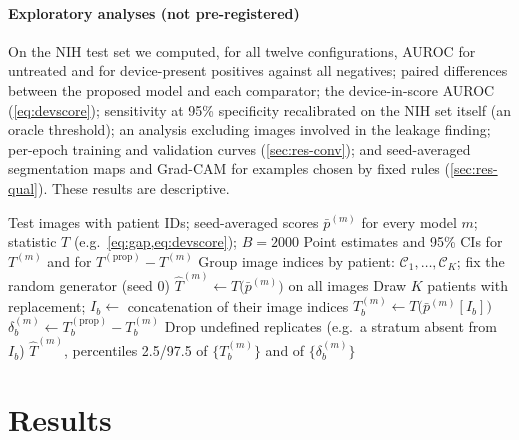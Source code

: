 \documentclass[final,3p]{elsarticle}
\begin{document}
\paragraph{Exploratory analyses (not pre-registered)} On the NIH test set we computed, for all twelve configurations, AUROC for untreated and for device-present positives against all negatives; paired differences between the proposed model and each comparator; the device-in-score AUROC (\cref{eq:devscore}); sensitivity at 95\% specificity recalibrated on the NIH set itself (an oracle threshold); an analysis excluding images involved in the leakage finding; per-epoch training and validation curves (\cref{sec:res-conv}); and seed-averaged segmentation maps and Grad-CAM \citep{selvaraju2020gradcam} for examples chosen by fixed rules (\cref{sec:res-qual}). These results are descriptive.

\begin{algorithm}[!tbp]
\caption{Patient-cluster bootstrap for CIs and paired differences}
\label{alg:boot}
\begin{algorithmic}[1]
\Require Test images with patient IDs; seed-averaged scores $\bar p^{(m)}$ for every model $m$; statistic $T$ (e.g.\ \cref{eq:gap,eq:devscore}); $B=2000$
\Ensure Point estimates and 95\% CIs for $T^{(m)}$ and for $T^{(\text{prop})}-T^{(m)}$
\State Group image indices by patient: $\mathcal{C}_1,\dots,\mathcal{C}_K$; fix the random generator (seed 0)
\State $\hat T^{(m)}\gets T\big(\bar p^{(m)}\big)$ on all images
  \State Draw $K$ patients with replacement; $I_b\gets$ concatenation of their image indices
   \State $T^{(m)}_b\gets T\big(\bar p^{(m)}[I_b]\big)$ 
  \EndFor
  \State $\delta^{(m)}_b\gets T^{(\text{prop})}_b-T^{(m)}_b$
\EndFor
\State Drop undefined replicates (e.g.\ a stratum absent from $I_b$)
\State \Return $\hat T^{(m)}$, percentiles 2.5/97.5 of $\{T^{(m)}_b\}$ and of $\{\delta^{(m)}_b\}$
\end{algorithmic}
\end{algorithm}

\section{Results}
\label{sec:results}
\end{document}
